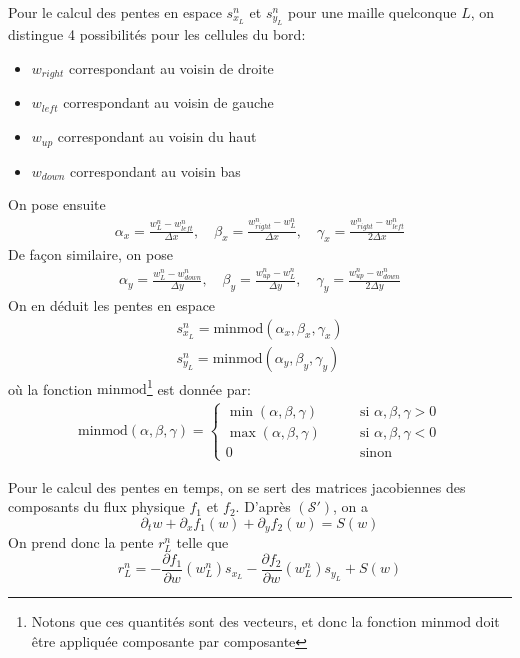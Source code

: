 \documentclass[
	french,
	11pt, %
]{fphw}
\begin{document}
Pour le calcul des pentes en espace $s^n_{x_L}$ et $s^n_{y_L}$ pour une maille quelconque $L$, on distingue 4 possibilités pour les cellules du bord:
\begin{itemize}
	\item $w_{right}$ correspondant au voisin de droite 
	\item $w_{left}$ correspondant au voisin de gauche
	\item $w_{up}$ correspondant au voisin du haut
	\item $w_{down}$ correspondant au voisin bas 
\end{itemize}
On pose ensuite
\begin{align*}
	\alpha_x = \frac{w^n_L - w^n_{left}}{\Delta x}, \quad
	\beta _x = \frac{w^n_{right} - w^n_{L}}{\Delta x}, \quad
	\gamma _x = \frac{w^n_{right} - w^n_{left}}{2\Delta x}
\end{align*}
De façon similaire, on pose
\begin{align*}
	\alpha_y = \frac{w^n_L - w^n_{down}}{\Delta y}, \quad
	\beta _y = \frac{w^n_{up} - w^n_{L}}{\Delta y}, \quad
	\gamma _y = \frac{w^n_{up} - w^n_{down}}{2\Delta y}
\end{align*}
On en déduit les pentes en espace
\begin{align*}
	s^n_{x_L} = \text{minmod}(\alpha_x, \beta _x, \gamma _x) \\
	s^n_{y_L} = \text{minmod}(\alpha_y, \beta _y, \gamma _y)
\end{align*}
où la fonction $\text{minmod}$\footnote{Notons que ces quantités sont des vecteurs, et donc la fonction $\text{minmod}$ doit être appliquée composante par composante} est donnée par:
\begin{align*}
	\text{minmod}(\alpha, \beta, \gamma) = 
	\begin{cases}
		\min(\alpha, \beta, \gamma) \qquad &\text{si  } \alpha,\beta,\gamma > 0 \\
		\max(\alpha, \beta, \gamma) \qquad &\text{si  } \alpha,\beta,\gamma < 0 \\
		0 \qquad &\text{sinon  }
	\end{cases}
\end{align*}

Pour le calcul des pentes en temps, on se sert des matrices jacobiennes des composants du flux physique $f_1$ et $f_2$. D'après $(\mathcal{S}')$, on a
$$
\partial_t w + \partial_x f_1(w) + \partial_y f_2(w) = S(w)
$$
On prend donc la pente $r^n_L$ telle que 
$$
r^n_L = - \frac{\partial f_1}{\partial w} (w^n_L) s_{x_L} - \frac{\partial f_2}{\partial w} (w^n_L) s_{y_L} + S(w) 
$$ 
\end{document}
